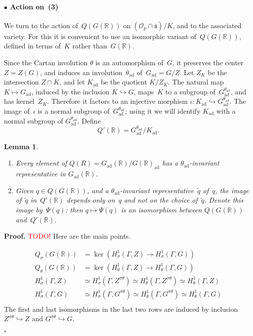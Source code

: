 \documentclass[10pt,leqno]{article}
\newtheorem{lemma}[equation]{Lemma}
\newcommand{\qed}{\hfill $\square$ \medskip}
\newenvironment{proof}[1][Proof]{\noindent\textbf{#1.} }{\qed}
\newcommand{\ad}{\mathrm{ad}}
\newcommand{\Gad}{G_\mathrm{ad}}
\newcommand{\Kad}{K_\mathrm{ad}}
\renewcommand{\O}{\mathcal O}
\newcommand{\R}{\mathbb R}
\newcommand{\s}{\mathfrak s}
\newcommand{\Op}{\O_p}
\begin{document}
 
\paragraph*{$\bullet$ Action on~(3)} We turn to the action of~$Q(G(\R))$ on $(\Op \cap \s)/K$, and to the associated variety. For this it is convenient to use an isomorphic variant of~$Q(G(\R))$, defined in terms of~$K$ rather than~$G(\R)$. 

Since the Cartan involution $\theta$ is an automorphism of~$G$, it preserves the center~$Z=Z(G)$, and induces an involution~$\theta_{\ad}$ of~$\Gad=G/Z$. Let $Z_K$ be the intersection $Z \cap K$, and let $K_{\ad}$ be the quotient $K/Z_K$. The natural map $K \mapsto \Gad$, induced by the inclusion $K \hookrightarrow G$, maps~$K$ to a subgroup of~$\Gad^{\theta_{\ad}}$, and has kernel~$Z_K$. Therefore it factors to an injective morphism $\iota\colon \Kad \hookrightarrow\Gad^{\theta_{\ad}} $. The image of~$\iota$ is a normal subgroup of~$\Gad^{\theta_{\ad}}$; using it we will identify $\Kad$ with a normal subgroup of $\Gad^{\theta_{\ad}}$. Define
\[ Q'(\R) = \Gad^{\theta_{\ad}}/\Kad.\]

\begin{lemma}\label{lem:q_and_qprime}
\begin{enumerate}
\item Every element of $Q(R)=\Gad(\R)/G(\R)_{\ad}$ has a $\theta_\ad$-invariant representative in $\Gad(\R)$.
\item Given $q \in Q(G(\R))$, and a $\theta_{\ad}$-invariant representative~$\tilde{q}$ of~$q$, the image of~$\tilde{q}$ in~$Q'(\R)$ depends only on~$q$ and not on the choice of~$\tilde{q}$. Denote this image by~$\Psi(q)$; then $q \mapsto \Psi(q)$ is an isomorphism between $Q(G(\R))$ and~$Q'(\R)$. 
\end{enumerate}
\end{lemma}

\begin{proof} \textcolor{red}{TODO!}
Here are the main points.

$$
\begin{aligned}
Q_\sigma(G(\R))&=\ker(H^1_\sigma(\Gamma,Z)\rightarrow H^1_\sigma(\Gamma,G))\\
Q_\theta(G(\R))&=\ker(H^1_\theta(\Gamma,Z)\rightarrow H^1_\theta(\Gamma,G))\\
H^1_\sigma(\Gamma,Z)&\simeq H^1_\sigma(\Gamma,Z^{\sigma\theta})\simeq H^1_\theta(\Gamma,Z^{\sigma\theta})\simeq H^1_\theta(\Gamma,Z)\\
H^1_\sigma(\Gamma,G)&\simeq H^1_\sigma(\Gamma,G^{\sigma\theta})\simeq H^1_\theta(\Gamma,G^{\sigma\theta})\simeq H^1_\theta(\Gamma,G)\\
\end{aligned}
$$
The first and last isomorphisms in the last two rows are induced by inclusion $Z^{\sigma\theta}\hookrightarrow Z$ and $G^{\sigma\theta}\hookrightarrow G$.

\end{proof}
\end{document}
